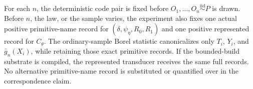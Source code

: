For each \(n\), the deterministic code pair is fixed before \(O_1,\ldots,O_n\stackrel{\mathrm{iid}}{\sim}P\) is drawn. Before \(n\), the law, or the sample varies, the experiment also fixes one actual positive primitive-name record for \((\delta,\psi_{\eta},R_0,R_1)\) and one positive represented record for \(C_{\theta}\). The ordinary-sample Borel statistic canonicalizes only \(T_i\), \(Y_i\), and \(\bar g_n(X_i)\), while retaining those exact primitive records. If the bounded-build substrate is compiled, the represented transducer receives the same full records. No alternative primitive-name record is substituted or quantified over in the correspondence claim.